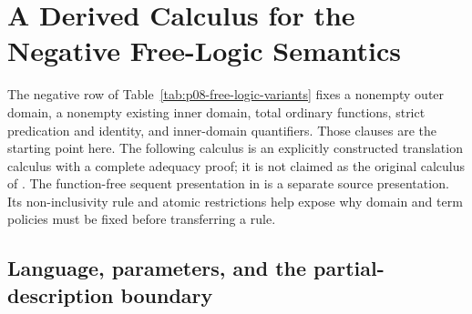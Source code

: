 \section{A Derived Calculus for the Negative Free-Logic Semantics}
\label{sec:p08-negative-free-logic-calculus}

The negative row of Table~\ref{tab:p08-free-logic-variants} fixes a nonempty
outer domain, a nonempty existing inner domain, total ordinary functions,
strict predication and identity, and inner-domain quantifiers.  Those clauses
are the starting point here.  The following calculus is an explicitly
constructed translation calculus with a complete adequacy proof; it is not
claimed as the original calculus of \cite{Lambert1967,Bencivenga1986,Lehmann2002}.
The function-free sequent presentation in
\cite[\S\S1.2, 1.3, 3.4]{GratzlPavlovicNolt2025} is a separate source
presentation.  Its non-inclusivity rule and atomic restrictions help expose
why domain and term policies must be fixed before transferring a rule.

\subsection{Language, parameters, and the partial-description boundary}

